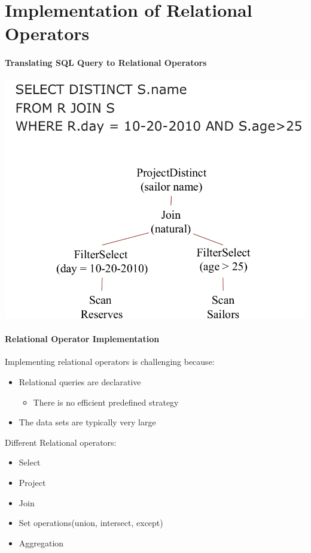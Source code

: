 \section{Implementation of Relational Operators}

\paragraph{Translating SQL Query to Relational Operators}

\includegraphics[scale=0.2]{graphics/sql-to-relational-op.png}


\paragraph{Relational Operator Implementation}
Implementing relational operators is challenging because:

\begin{itemize}
\item Relational queries are declarative
  \begin{itemize}
  \item There is no efficient predefined strategy
  \end{itemize}

\item The data sets are typically very large
\end{itemize}

Different Relational operators:
\begin{itemize}
\item Select
\item Project
\item Join
\item Set operations(union, intersect, except)
\item Aggregation
\end{itemize}

